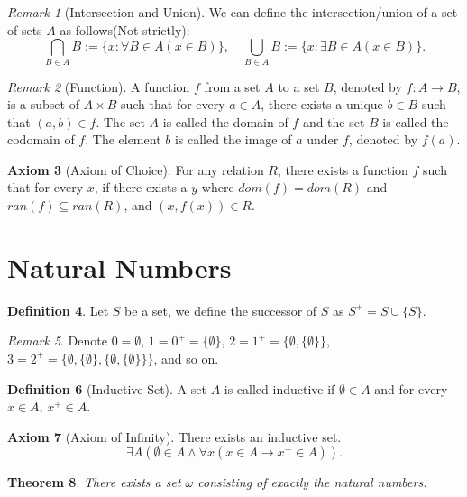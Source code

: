 \documentclass[12pt, reqno]{amsart}
\newtheorem{theorem}{Theorem}[section]
\theoremstyle{definition}
\newtheorem{definition}[theorem]{Definition}
\newtheorem{axiom}[theorem]{Axiom}
\theoremstyle{remark}
\newtheorem{remark}[theorem]{Remark}
\numberwithin{equation}{section}
\begin{document}
{\begin{remark}[Intersection and Union]
    We can define the intersection/union of a set of sets $A$ as follows(Not strictly):
    \[
        \bigcap_{B \in A} B := \{x: \forall B \in A (x \in B)\}, \quad \bigcup_{B \in A} B := \{x: \exists B \in A (x \in B)\}.
    \]
\end{remark}

\begin{remark}[Function]
    A function $f$ from a set $A$ to a set $B$, denoted by $f: A \to B$, is a subset of $A\times B$ such that for every $a\in A$, there exists a unique $b\in B$ such that $(a, b)\in f$. The set $A$ is called the domain of $f$ and the set $B$ is called the codomain of $f$. The element $b$ is called the image of $a$ under $f$, denoted by $f(a)$.
\end{remark}

\begin{axiom}[Axiom of Choice]
    For any relation $R$, there exists a function $f$ such that for every $x$, if there exists a $y$ where $dom(f) = dom(R)$ and $ran(f) \subseteq ran(R)$, and $(x, f(x))\in R$.
\end{axiom}

\section{Natural Numbers}

\begin{definition}
    Let $S$ be a set, we define the successor of $S$ as $S^+ = S \cup \{S\}$.
\end{definition}
\begin{remark}
    Denote $0 = \emptyset$, $1 = 0^+ = \{\emptyset\}$, $2 = 1^+ = \{\emptyset, \{\emptyset\}\}$, $3 = 2^+ = \{\emptyset, \{\emptyset\}, \{\emptyset, \{\emptyset\}\}\}$, and so on.
\end{remark}

\begin{definition}[Inductive Set]
    A set $A$ is called inductive if $\emptyset \in A$ and for every $x\in A$, $x^+ \in A$.
\end{definition}

\begin{axiom}[Axiom of Infinity]
    There exists an inductive set.  
    \[
        \exists A (\emptyset \in A \land \forall x (x\in A \to x^+ \in A)).
    \]
\end{axiom}

\begin{theorem}
    There exists a set $\omega$ consisting of exactly the natural numbers.
\end{theorem}

}
\end{document}
